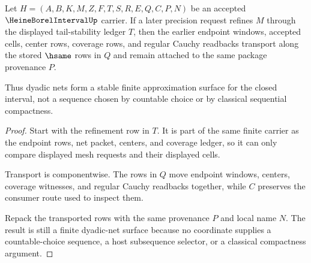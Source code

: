 \begin{theorem}
\label{thm:heine-borel-interval-tail-stability}
Let $H=(A,B,K,M,Z,F,T,S,R,E,Q,C,P,N)$ be an accepted $\HeineBorelIntervalUp$ carrier. If a later precision request refines $M$ through the displayed tail-stability ledger $T$, then the earlier endpoint windows, accepted cells, center rows, coverage rows, and regular Cauchy readbacks transport along the stored $\hsame$ rows in $Q$ and remain attached to the same package provenance $P$.

Thus dyadic nets form a stable finite approximation surface for the closed interval, not a sequence chosen by countable choice or by classical sequential compactness.
\end{theorem}
\begin{proof}
Start with the refinement row in $T$. It is part of the same finite carrier as the endpoint rows, net packet, centers, and coverage ledger, so it can only compare displayed mesh requests and their displayed cells.

Transport is componentwise. The rows in $Q$ move endpoint windows, centers, coverage witnesses, and regular Cauchy readbacks together, while $C$ preserves the consumer route used to inspect them.

Repack the transported rows with the same provenance $P$ and local name $N$. The result is still a finite dyadic-net surface because no coordinate supplies a countable-choice sequence, a host subsequence selector, or a classical compactness argument.
\end{proof}

